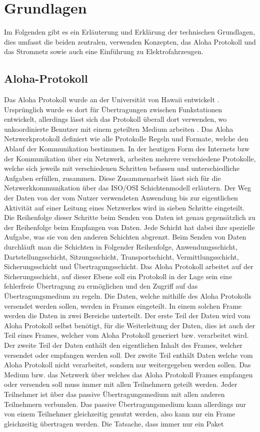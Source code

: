 \chapter{Grundlagen}
\label{chap:grundlagen}
Im Folgenden gibt es ein Erläuterung und Erklärung der technischen Grundlagen, dies umfasst die beiden zentralen, verwenden Konzepten, das Aloha Protokoll und das Stromnetz sowie auch eine Einführung zu Elektrofahrzeugen.

\section{Aloha-Protokoll}
\label{capBack:Aloha}
Das Aloha Protokoll wurde an der Universität von Hawaii entwickelt \cite{aloha_firstsource}. Ursprünglich wurde es dort für Übertragungen zwischen Funkstationen entwickelt, allerdings lässt sich das Protokoll überall dort verwenden, wo unkoordinierte Benutzer mit einem geteilten Medium arbeiten \cite{Back_AlohaPure}. Das Aloha Netzwerkprotokoll definiert wie alle Protokolle Regeln und Formate, welche den Ablauf der Kommunikation bestimmen. In der heutigen Form des Internets bzw der Kommunikation über ein Netzwerk, arbeiten mehrere verschiedene Protokolle, welche sich jeweils mit verschiedenen Schritten befassen und unterschiedliche Aufgaben erfüllen, zusammen. Diese Zusammenarbeit lässt sich für die Netzwerkkommunikation über das ISO/OSI Schichtenmodell erläutern. Der Weg der Daten von der vom Nutzer verwendeten Anwendung bis zur eigentlichen Aktivität auf einer Leitung eines Netzwerkes wird in sieben Schritte eingeteilt. Die Reihenfolge dieser Schritte beim Senden von Daten ist genau gegensätzlich zu der Reihenfolge beim Empfangen von Daten. Jede Schicht hat dabei ihre spezielle Aufgabe, was sie von den anderen Schichten abgrenzt. Beim Senden von Daten durchläuft man die Schichten in Folgender Reihenfolge, Anwendungsschicht, Dartstellungsschicht, Sitzungsschicht, Transportschicht, Vermittlungsschicht, Sicherungsschicht und Übertragungsschicht. Das Aloha Protokoll arbeitet auf der Sicherungsschicht, auf dieser Ebene soll ein Protokoll in der Lage sein eine fehlerfreie Übertragung zu ermöglichen und den Zugriff auf das Übertragungsmedium zu regeln. Die Daten, welche mithilfe des Aloha Protokolls versendet werden sollen, werden in Frames eingeteilt. In einem solchen Frame werden die Daten in zwei Bereiche unterteilt. Der erste Teil der Daten wird vom Aloha Protokoll selbst benötigt, für die Weiterleitung der Daten, dies ist auch der Teil eines Frames, welcher vom Aloha Protokoll generiert bzw. verarbeitet wird. Der zweite Teil der Daten enthält den eigentlichen Inhalt des Frames, welcher versendet oder empfangen werden soll. Der zweite Teil enthält Daten welche vom Aloha Protokoll nicht verarbeitet, sondern nur weitergegeben werden sollen. Das Medium bzw. das Netzwerk über welches das Aloha Protokoll Frames empfangen oder versenden soll muss immer mit allen Teilnehmern geteilt werden. Jeder Teilnehmer ist über das passive Übertragungsmedium mit allen anderen Teilnehmern verbunden. Das passive Übertragungsmedium kann allerdings nur von einem Teilnehmer gleichzeitig genutzt werden, also kann nur ein Frame gleichzeitig übertragen werden. Die Tatsache, dass immer nur ein Paket 